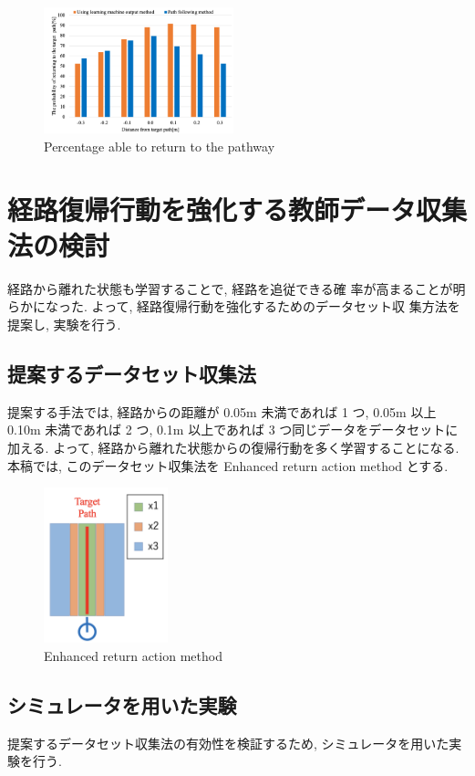 \documentclass{jarticle}
\begin{document}
\begin{figure}[h!]
  \centering
   \includegraphics[height=36.6mm]{./figs/path.png}
   \caption{Percentage able to return to the pathway}
\end{figure}



\section{経路復帰行動を強化する教師データ収集法の検討}

経路から離れた状態も学習することで, 経路を追従できる確
率が高まることが明らかになった. よって, 経路復帰行動を強化するためのデータセット収
集方法を提案し, 実験を行う.

\subsection{提案するデータセット収集法}
提案する手法では, 経路からの距離が 0.05m 未満であれば 1 つ,  0.05m 以上 0.10m 未満であれば 2 つ, 
0.1m 以上であれば 3 つ同じデータをデータセットに加える.
よって, 経路から離れた状態からの復帰行動を多く学習することになる.
本稿では, このデータセット収集法を Enhanced return action method とする.

\begin{figure}[h!]\vspace*{-3mm}
  \centering
   \includegraphics[height=45mm]{./figs/method.png}
   \caption{Enhanced return action method}
\end{figure}


\subsection{シミュレータを用いた実験}
提案するデータセット収集法の有効性を検証するため, シミュレータを用いた実験を行う.
\vspace*{2.5mm}
\end{document}
